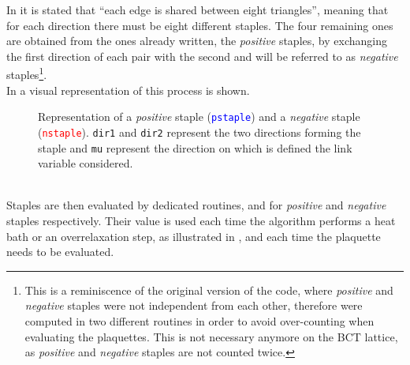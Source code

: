 In  it is stated that ``each edge is shared between eight triangles'', meaning that for each direction there must be eight different staples.
The four remaining ones are obtained from the ones already written, the \emph{positive} staples, by exchanging the first direction of each pair with the second and will be referred to as \emph{negative} staples\footnote{This is a reminiscence of the original version of the code, where \emph{positive} and \emph{negative} staples were not independent from each other, therefore were computed in two different routines in order to avoid over-counting when evaluating the plaquettes. This is not necessary anymore on the BCT lattice, as \emph{positive} and \emph{negative} staples are not counted twice.}.\\
In  a visual representation of this process is shown.
\begin{figure}[!htbp]
    \centering
    \caption{Representation of a \emph{positive} staple (\textcolor{blue}{\texttt{pstaple}}) and a \emph{negative} staple (\textcolor{red}{\texttt{nstaple}}). \texttt{dir1} and \texttt{dir2} represent the two directions forming the staple and \texttt{mu} represent the direction on which is defined the link variable considered.}
    \label{4F:Staples}
\end{figure}\\
Staples are then evaluated by dedicated routines,  and  for \emph{positive} and \emph{negative} staples respectively.
Their value is used each time the algorithm performs a heat bath or an overrelaxation step, as illustrated in , and each time the plaquette needs to be evaluated.

